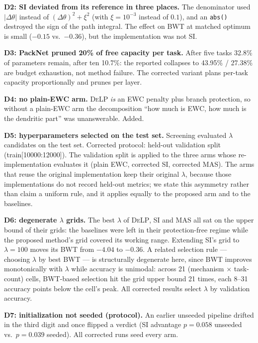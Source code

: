 \documentclass[conference]{IEEEtran}
\newcommand{\delp}{\textsc{DeLP}}
\begin{document}
\noindent\textbf{D2: SI deviated from its reference in three places.} The denominator used
$|\Delta\theta|$ instead of $(\Delta\theta)^2+\xi^2$ (with $\xi=10^{-3}$ instead of $0.1$), and an
\texttt{abs()} destroyed the sign of the path integral. The effect on BWT at matched optimum is
small ($-0.15$ vs.\ $-0.36$), but the implementation was not SI.

\noindent\textbf{D3: PackNet pruned 20\% of free capacity per task.} After five tasks 32.8\% of
parameters remain, after ten 10.7\%: the reported collapses to 43.95\% / 27.38\% are budget
exhaustion, not method failure. The corrected variant plans per-task capacity proportionally and
prunes per layer.

\noindent\textbf{D4: no plain-EWC arm.} \delp{} \emph{is} an EWC penalty plus branch protection, so
without a plain-EWC arm the decomposition ``how much is EWC, how much is the dendritic part'' was
unanswerable. Added.

\noindent\textbf{D5: hyperparameters selected on the test set.} Screening evaluated $\lambda$
candidates on the test set. Corrected protocol: held-out validation split (train[10000:12000]).
The validation split is applied to the three arms whose re-implementation evaluates it (plain
EWC, corrected SI, corrected MAS). The arms that reuse the original implementation keep their
original $\lambda$, because those implementations do not record held-out metrics; we state this
asymmetry rather than claim a uniform rule, and it applies equally to the proposed arm and to
the baselines.

\noindent\textbf{D6: degenerate $\lambda$ grids.} The best $\lambda$ of \delp{}, SI and MAS all sat
on the upper bound of their grids: the baselines were left in their protection-free regime while
the proposed method's grid covered its working range. Extending SI's grid to $\lambda=100$ moves
its BWT from $-4.04$ to $-0.36$. A related selection rule --- choosing $\lambda$ by best BWT ---
is structurally degenerate here, since BWT improves monotonically with $\lambda$ while accuracy is
unimodal: across 21 (mechanism $\times$ task-count) cells, BWT-based selection hit the grid upper
bound 21 times, each 8--31 accuracy points below the cell's peak. All corrected results select
$\lambda$ by validation accuracy.

\noindent\textbf{D7: initialization not seeded (protocol).} An earlier unseeded pipeline drifted in
the third digit and once flipped a verdict (SI advantage $p=0.058$ unseeded vs.\ $p=0.039$
seeded). All corrected runs seed every arm.
\end{document}
